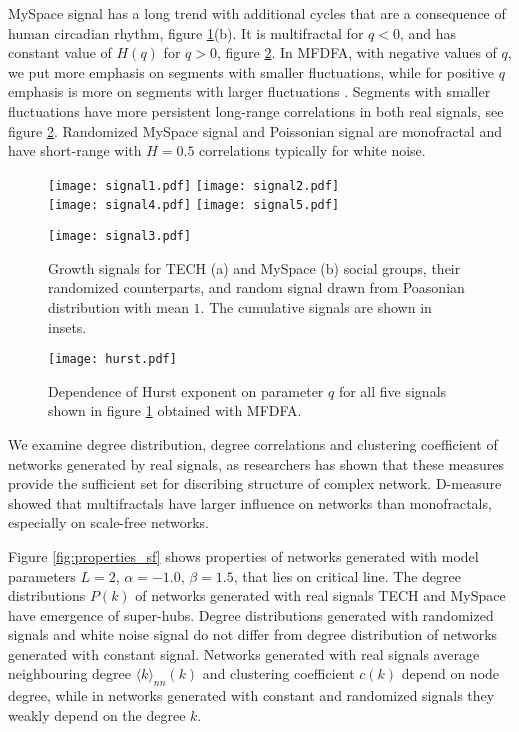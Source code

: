 MySpace signal has a long trend with additional cycles that are a consequence of human circadian rhythm, figure \ref{fig:signals}(b). It is multifractal for $q<0$, and has constant value of $H(q)$ for $q>0$, figure \ref{fig:mfdfa}. In MFDFA, with negative values of $q$, we put more emphasis on segments with smaller fluctuations, while for positive $q$ emphasis is more on segments with larger fluctuations \cite{ihlen2012}. Segments with smaller fluctuations have more persistent long-range correlations in both real signals, see figure \ref{fig:mfdfa}. Randomized MySpace signal and Poissonian signal are monofractal and have short-range with $H=0.5$ correlations typically for white noise.   
\begin{figure}[H]
	\centering
	\texttt{[image: signal1.pdf]}
	\texttt{[image: signal2.pdf]}\\
	
	\texttt{[image: signal4.pdf]}
	\texttt{[image: signal5.pdf]} \\
    \begin{center}
	
	\texttt{[image: signal3.pdf]}
	\end{center}
	\caption{Growth signals for TECH (a) and MySpace (b) social groups, their randomized counterparts, and random signal drawn from Poasonian distribution with mean $1$. The cumulative signals are shown in insets.}
\label{fig:signals}
\end{figure}

\begin{figure}[H]
	\centering
	\texttt{[image: hurst.pdf]}
	\caption{Dependence of Hurst exponent on parameter $q$ for all five signals shown in figure \ref{fig:signals} obtained with MFDFA. }
	\label{fig:mfdfa}
\end{figure}




We examine degree distribution, degree correlations and clustering coefficient of networks generated by real signals, as researchers has shown that these measures provide the sufficient set for discribing structure of complex network. D-measure showed that multifractals have larger influence on networks than monofractals, especially on scale-free networks. 

Figure \ref{fig:properties_sf} shows properties of networks generated with model parameters $L=2$, $\alpha=-1.0$, $\beta=1.5$, that lies on critical line.  The degree distributions $P(k)$ of networks generated with real signals TECH and MySpace have emergence of super-hubs. Degree distributions generated with randomized signals and white noise signal do not differ from degree distribution of networks generated with constant signal. Networks generated with real signals average neighbouring degree $\langle k\rangle_{nn}(k)$ and clustering coefficient $c(k)$ depend on node degree, while in networks generated with constant and randomized signals they weakly depend on the degree $k$.

